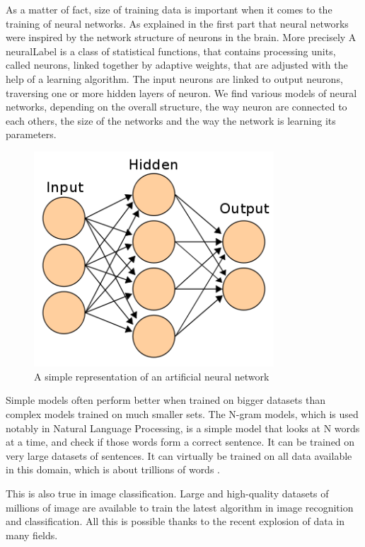 \documentclass[12pt]{article}
\begin{document}
As a matter of fact, size of training data is important when it comes to the
training of neural networks. As explained in the first part that neural networks were
inspired by the network structure of neurons in the brain. More precisely A \gls{neuralLabel} is a class of statistical
functions, that contains processing units, called neurons, linked together by
adaptive weights, that are adjusted with the help of a learning algorithm.
The input neurons are linked to output neurons, traversing one or more hidden
layers of neuron. We find various models of neural networks, depending on the
overall  structure, the way neuron are connected to each others, the size of
the networks and the way the network is learning its parameters.

\begin{figure}[ht]
    \centering
    \includegraphics[width=0.8\textwidth]{ann}
    \caption{A simple representation of an artificial neural network}
    \label{fig:ann}
\end{figure}


Simple models often perform better when trained on bigger datasets
\cite{moreData} than complex models trained on much smaller sets. The N-gram
models, which is used notably in Natural Language Processing, is a simple model
that looks at N words at a time, and check if those words form a correct
sentence. It can be trained on very large datasets of sentences. It can
virtually be trained on all data available in this domain, which is about
trillions of words \cite{ngram}.

This is also true in image classification. Large and high-quality datasets of
millions of image are available to train the latest algorithm in image
recognition and classification. All this is possible thanks to the recent
explosion of data in many fields.
\end{document}
